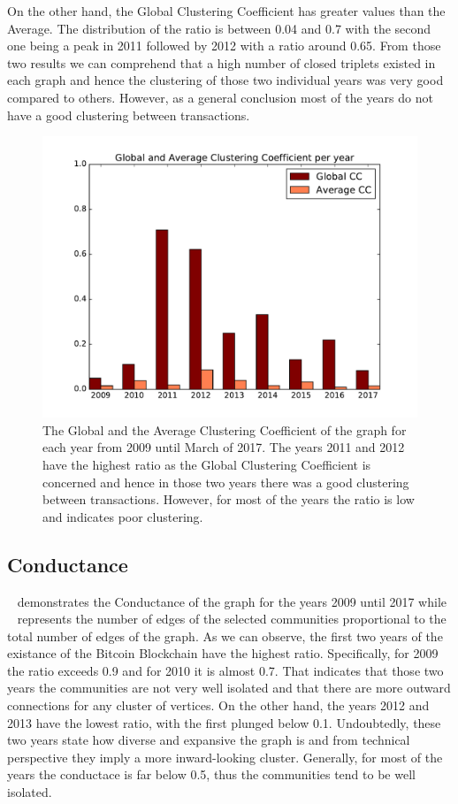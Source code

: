 On the other hand, the Global Clustering Coefficient has greater values than the Average. The distribution of the ratio is between 0.04 and 0.7 with the second one being a peak in 2011 followed by 2012 with a ratio around 0.65. From those two results we can comprehend that a high number of closed triplets existed in each graph and hence the clustering of those two individual years was very good compared to others. However, as a general conclusion most of the years do not have a good clustering between transactions.

\begin{figure}[t]
\includegraphics[width=1\linewidth]{./images/cc}
\centering
\caption{The Global and the Average Clustering Coefficient of the graph for each year from 2009 until March of 2017. The years 2011 and 2012 have the highest ratio as the Global Clustering Coefficient is concerned and hence in those two years there was a good clustering between transactions. However, for most of the years the ratio is low and indicates poor clustering.}
\label{fig:fig5}
\end{figure}


\subsection{Conductance}
~ demonstrates the Conductance of the graph for the years 2009 until 2017 while
~ represents the number of edges of the selected communities proportional to the total number of edges of the graph. 
As we can observe, the first two years of the existance
of the Bitcoin Blockchain have the highest ratio. Specifically,
for 2009 the ratio exceeds 0.9 and for 2010 it is almost 0.7. That indicates
that those two years the communities are not very well isolated and that there are more outward connections 
for any cluster of vertices. On the other
hand, the years 2012 and 2013 have the lowest ratio, with the first plunged
below 0.1. Undoubtedly, these two years state how diverse and expansive the
graph is and from technical perspective they imply a more inward-looking cluster. 
Generally, for most of the years the conductace is far below 0.5,
thus the communities tend to be well isolated.


